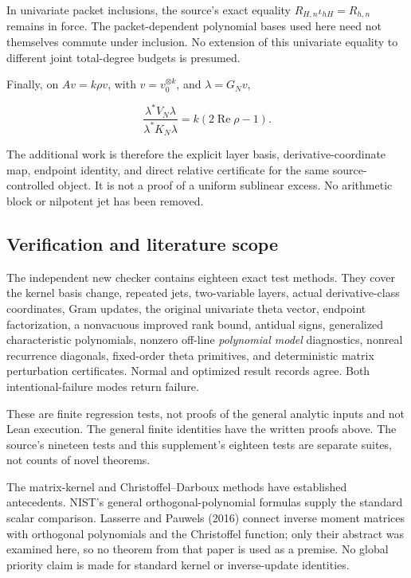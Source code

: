 \documentclass[
]{article}
\begin{document}
In univariate packet inclusions, the source's exact equality
\(R_{H,n}\iota_{hH}=R_{h,n}\) remains in force. The packet-dependent
polynomial bases used here need not themselves commute under inclusion.
No extension of this univariate equality to different joint total-degree
budgets is presumed.

Finally, on \(Av=k\rho v\), with \(v=v_0^{\otimes k}\), and
\(\lambda=G_Nv\),

\[
\frac{\lambda^*V_N\lambda}{\lambda^*K_N\lambda}
=k(2\operatorname{Re}\rho-1).
\tag{30}
\]

The additional work is therefore the explicit layer basis,
derivative-coordinate map, endpoint identity, and direct relative
certificate for the same source-controlled object. It is not a proof of
a uniform sublinear excess. No arithmetic block or nilpotent jet has
been removed.

\subsection{Verification and literature
scope}\label{verification-and-literature-scope}

The independent new checker contains eighteen exact test methods. They
cover the kernel basis change, repeated jets, two-variable layers,
actual derivative-class coordinates, Gram updates, the original
univariate theta vector, endpoint factorization, a nonvacuous improved
rank bound, antidual signs, generalized characteristic polynomials,
nonzero off-line \emph{polynomial model} diagnostics, nonreal recurrence
diagonals, fixed-order theta primitives, and deterministic matrix
perturbation certificates. Normal and optimized result records agree.
Both intentional-failure modes return failure.

These are finite regression tests, not proofs of the general analytic
inputs and not Lean execution. The general finite identities have the
written proofs above. The source's nineteen tests and this supplement's
eighteen tests are separate suites, not counts of novel theorems.

The matrix-kernel and Christoffel--Darboux methods have established
antecedents. NIST's general orthogonal-polynomial formulas supply the
standard scalar comparison. Lasserre and Pauwels (2016) connect inverse
moment matrices with orthogonal polynomials and the Christoffel
function; only their abstract was examined here, so no theorem from that
paper is used as a premise. No global priority claim is made for
standard kernel or inverse-update identities.
\end{document}
